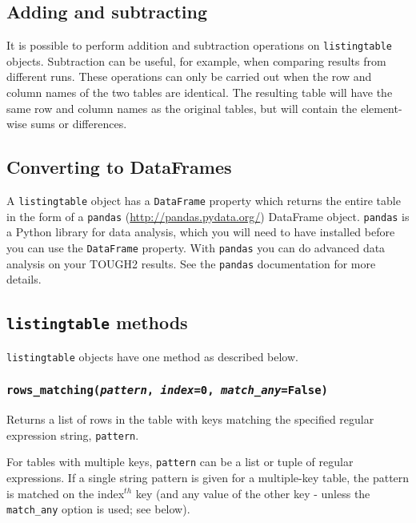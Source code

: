 \subsection{Adding and subtracting}
It is possible to perform addition and subtraction operations on \texttt{listingtable} objects.  Subtraction can be useful, for example, when comparing results from different runs.  These operations can only be carried out when the row and column names of the two tables are identical.  The resulting table will have the same row and column names as the original tables, but will contain the element-wise sums or differences.

\subsection{Converting to DataFrames}

A \texttt{listingtable} object has a \texttt{DataFrame} property which returns the entire table in the form of a \texttt{pandas} (\url{http://pandas.pydata.org/}) DataFrame object. \texttt{pandas} is a Python library for data analysis, which you will need to have installed before you can use the \texttt{DataFrame} property. With \texttt{pandas} you can do advanced data analysis on your TOUGH2 results. See the \texttt{pandas} documentation for more details.

\subsection{\texttt{listingtable} methods}

\texttt{listingtable} objects have one method as described below.

\begin{snugshade}
\subsubsection{\texttt{rows\_matching(\emph{pattern}, \emph{index}=0, \emph{match\_any}=False)}}
\end{snugshade}

Returns a list of rows in the table with keys matching the specified regular expression string, \texttt{pattern}.

For tables with multiple keys, \texttt{pattern} can be a list or tuple of regular expressions.  If a single string pattern is given for a multiple-key table, the pattern is matched on the index$^{th}$ key (and any value of the other key - unless the \texttt{match\_any} option is used; see below).

